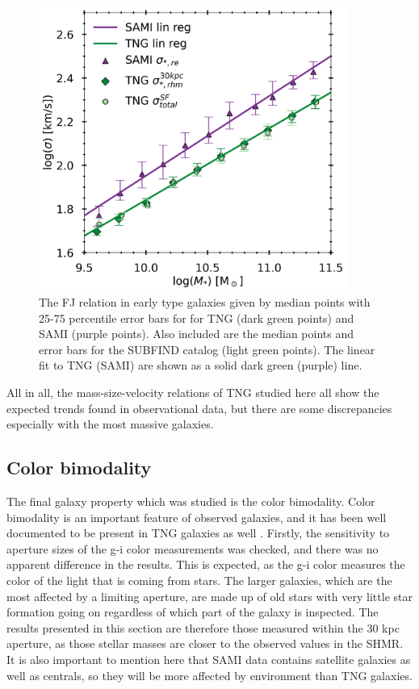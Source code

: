 \begin{figure}
    \centering
    \includegraphics[width=0.9\textwidth]{images/FJ.png}
    \caption{The FJ relation in early type galaxies given by median points with 25-75 percentile error bars for for TNG (dark green points) and SAMI (purple points). Also included are the median points and error bars for the SUBFIND catalog (light green points). The linear fit to TNG (SAMI) are shown as a solid dark green (purple) line.}
    \label{FJ}
\end{figure}

All in all, the mass-size-velocity relations of TNG studied here all show the expected trends found in observational data, but there are some discrepancies especially with the most massive galaxies.

\subsection{Color bimodality}
The final galaxy property which was studied is the color bimodality. Color bimodality is an important feature of observed galaxies, and it has been well documented to be present in TNG galaxies as well \parencite{Nelson2017}. Firstly, the sensitivity to aperture sizes of the g-i color measurements was checked, and there was no apparent difference in the results. This is expected, as the g-i color measures the color of the light that is coming from stars. The larger galaxies, which are the most affected by a limiting aperture, are made up of old stars with very little star formation going on regardless of which part of the galaxy is inspected. The results presented in this section are therefore those measured within the 30 kpc aperture, as those stellar masses are closer to the observed values in the SHMR. It is also important to mention here that SAMI data contains satellite galaxies as well as centrals, so they will be more affected by environment than TNG galaxies.

